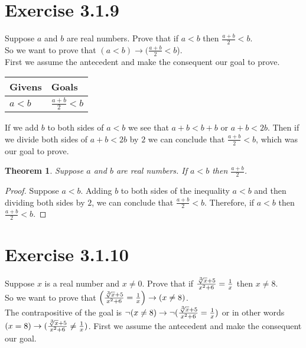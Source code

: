 \documentclass{article}
\newcommand{\n}{ \noindent }
\newtheorem*{theorem}{Theorem}  %
\begin{document}
\section*{Exercise 3.1.9}
Suppose $a$ and $b$ are real numbers. Prove that if $a<b$ then $\tfrac{a+b}{2} < b$. \\

\n So we want to prove that
$(a<b) \rightarrow (\tfrac{a+b}{2} < b$). \\

\n First we assume the antecedent and make the consequent our goal to prove.

\begin{table}[h]
\begin{tabular}{ll}
\hline
Givens & Goals   \\ \hline
$a<b$ & $\tfrac{a+b}{2} < b$   \\ \hline
\end{tabular}
\end{table}

\n If we add $b$ to both sides of $a<b$ we see that $a + b < b + b$ or $a + b < 2b$. Then if we divide both sides of $a + b < 2b$ by $2$ we can conclude that $\tfrac{a+b}{2} < b$, which was our goal to prove.

\begin{theorem} Suppose $a$ and $b$ are real numbers. If $a<b$ then $\tfrac{a + b}{2}$.
\end{theorem}
\begin{proof}
Suppose $a<b$. Adding $b$ to both sides of the inequality $a<b$ and then dividing both sides by $2$, we can conclude that $\tfrac{a+b}{2} < b$. Therefore, if $a<b$ then $\tfrac{a+b}{2} < b$.
\end{proof}

\section*{Exercise 3.1.10}
Suppose $x$ is a real number and $x \neq 0$. Prove that if $\tfrac{\sqrt[\leftroot{-1}\uproot{1}3]{x} + 5}{x^2 + 6} = \tfrac{1}{x}$ then $x \neq 8$. \\

\n So we want to prove that
$\left(\tfrac{\sqrt[\leftroot{-1}\uproot{1}3]{x} + 5}{x^2 + 6} = \tfrac{1}{x} \right) \rightarrow (x \neq 8)$. \\

\n The contrapositive of the goal is $\neg(x \neq 8) \rightarrow \neg(\tfrac{\sqrt[\leftroot{-1}\uproot{1}3]{x} + 5}{x^2 + 6} = \tfrac{1}{x})$ or in other words $(x = 8) \rightarrow (\tfrac{\sqrt[\leftroot{-1}\uproot{1}3]{x} + 5}{x^2 + 6} \neq \tfrac{1}{x})$. First we assume the antecedent and make the consequent our goal.
\end{document}
